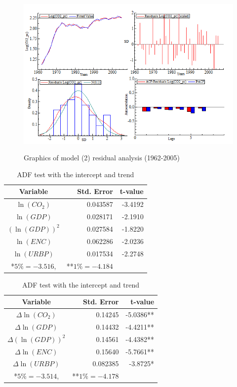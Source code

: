 \documentclass[12pt, a4paper]{article}
\begin{document}
\begin{figure}[htbp]
  \begin{center}
    \caption{Graphics of model (2) residual analysis (1962-2005)}
    \includegraphics[scale=0.8]{fig2.png}
    \label{fig2} 
  \end{center}
\end{figure}


\begin{table}[h]
  \caption{ADF test with the intercept and trend}
  \label{adf1}
  \centering
  \begin{tabular}{crr}
    \hline
   Variable  & Std. Error & t-value\\
\hline\hline
$\ln{(CO_2)}$ &   0.043587   &   -3.4192 \\
$\ln{(GDP)}$  & 0.028171     & -2.1910 \\
$(\ln{(GDP)})^2$ &  0.027584 &     -1.8220  \\
$\ln{(ENC)}$ &  0.062286   &   -2.0236 \\
$\ln{(URBP)}$ & 0.017534  &    -2.2748 \\
    \hline
    *$5\%=-3.516$, & **$1\%=-4.184$
  \end{tabular}
\end{table}


\begin{table}[h]
  \caption{ADF test with the intercept and trend}
  \label{adf2}
  \centering
  \begin{tabular}{crr}
    \hline
   Variable  & Std. Error & t-value\\
\hline\hline
$\varDelta{\ln{(CO_2)}}$  & 0.14245  &    -5.0386**\\
$\varDelta{\ln{(GDP)}}$ &    0.14432 &     -4.4211**\\
$\varDelta{(\ln{(GDP)})^2}$ &     0.14561 &     -4.4382**\\
$\varDelta{\ln{(ENC)}}$ &  0.15640  &    -5.7661**\\
$\varDelta{\ln{(URBP)}}$ &    0.082385  &    -3.8725*\\
    \hline
*$5\%=-3.514$,& **$1\%=-4.178$
  \end{tabular}
\end{table}
\end{document}
